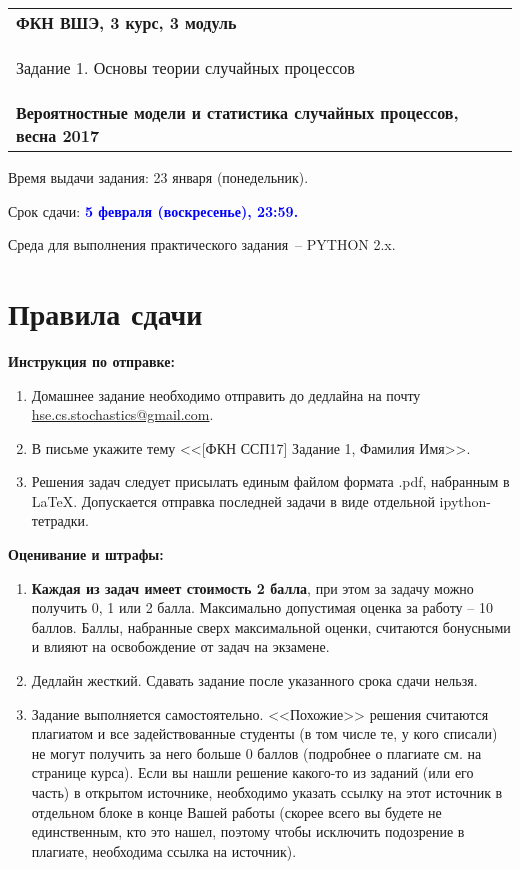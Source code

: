 \documentclass[a4paper,14pt]{extreport}
\renewcommand{\=}[1]{\stackrel{#1}{=}} %
\begin{document}
\begin{center}
    \begin{tabular}{|p{15.5cm}|}
        \hline
        \textbf{ФКН ВШЭ, 3 курс, 3 модуль}\\
        \begin{center} \Large Задание 1. Основы теории случайных процессов
        \end{center}\\
        \textbf{Вероятностные модели и статистика случайных процессов, весна 2017}\\
        \hline
    \end{tabular}
\end{center}

Время выдачи задания: 23 января (понедельник).

Срок сдачи: \textcolor{blue}{\bf 5 февраля (воскресенье), 23:59.}

Среда для выполнения практического задания~-- PYTHON 2.x.

\section*{Правила сдачи}

\textbf{Инструкция по отправке:} 
\begin{enumerate}
\item Домашнее задание необходимо отправить
до дедлайна на почту \href{mailto:hse.cs.stochastics@gmail.com}
{hse.cs.stochastics@gmail.com}.
\item В письме укажите тему 
<<[ФКН ССП17] Задание 1, Фамилия Имя>>.
\item Решения задач следует присылать единым файлом
формата .pdf, набранным в \LaTeX. Допускается отправка
последней задачи в виде отдельной ipython-тетрадки.
\end{enumerate}

\textbf{Оценивание и штрафы:} 
\begin{enumerate}
\item \textbf{Каждая из задач имеет стоимость 2 балла}, при этом
за задачу можно получить 0, 1 или 2 балла.
Максимально допустимая оценка за работу -- 10 баллов. 
Баллы, набранные сверх максимальной оценки, 
считаются бонусными и влияют на освобождение от задач на экзамене.
\item Дедлайн жесткий. Сдавать задание после указанного
срока сдачи нельзя.
\item Задание выполняется самостоятельно.
<<Похожие>> решения считаются плагиатом и все задействованные студенты (в том числе те, у кого списали) не могут получить за него больше 0 баллов (подробнее о плагиате см. на странице курса). Если вы нашли решение какого-то из заданий (или его часть) в открытом источнике, необходимо указать ссылку на этот источник в отдельном блоке в конце Вашей работы (скорее всего вы будете не единственным, кто это нашел, поэтому чтобы исключить подозрение в плагиате, необходима ссылка на источник).
\end{enumerate}
\end{document}
